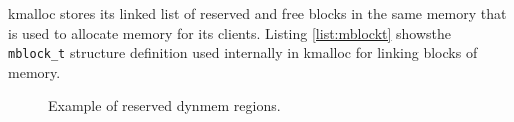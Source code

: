 kmalloc stores its linked list of reserved and free blocks in the same memory
that is used to allocate memory for its clients. Listing \ref{list:mblockt}
showsthe \verb+mblock_t+ structure definition used internally in kmalloc for
linking blocks of memory.

\begin{figure}
  
  \centering
  \caption{Example of reserved dynmem regions.}
  \label{figure:dynmem_blocks}
\end{figure}






